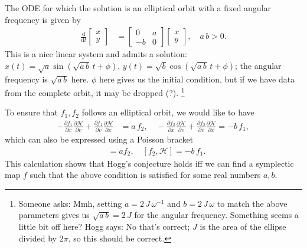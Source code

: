 \documentclass{article}
\newcommand{\dd}{\mathrm{d}}
\begin{document}
The ODE for which the solution is an elliptical orbit with a fixed angular frequency is given by 
\begin{align}
    \frac{\dd}{\dd t} \begin{bmatrix} x \\ y \end{bmatrix} &= \begin{bmatrix} 0 & a \\ -b & 0 \end{bmatrix} \begin{bmatrix} x \\ y \end{bmatrix}, \quad a\,b > 0. 
\end{align}
This is a nice linear system and admits a solution:  $x(t)=\sqrt{a} \sin(\sqrt{a\,b}\,t + \phi) $, $y(t)= \sqrt{b} \cos(\sqrt{a\,b}\,t + \phi)$; the angular frequency is $\sqrt{a\,b}$ here. $\phi$ here gives us the initial condition, but if we have data from the complete orbit, it may be dropped (?). \footnote{Someone asks: Mmh, setting $a = 2\,J\,\omega^{-1}$ and $b = 2\,J\,\omega$ to match the above parameters gives us $\sqrt{a\,b}=2\,J$ for the angular frequency. Something seems a little bit off here? Hogg says: No that's correct; $J$ is the area of the ellipse divided by $2\pi$, so this should be correct.}

To ensure that $f_1, f_2$ follows an elliptical orbit, we would like to have
\begin{align}
    - \frac{\partial f_1}{\partial x} \frac{\partial \mathcal{H}}{\partial v} + \frac{\partial f_1}{\partial v} \frac{\partial \mathcal{H}}{\partial x} &= a\,f_2, \quad
     - \frac{\partial f_2}{\partial x} \frac{\partial \mathcal{H}}{\partial v} + \frac{\partial f_2}{\partial v} \frac{\partial \mathcal{H}}{\partial x} = -b\,f_1,
\end{align}
which can also be expressed using a Poisson bracket 
\begin{align}
    [f_1, \mathcal{H}] &= a f_2, \quad [f_2, \mathcal{H}] = -b\,f_1. 
\end{align}
This calculation shows that Hogg's conjecture holds iff we can find a symplectic map $f$ such that the above condition is satisfied for some real numbers $a, b$. 
\end{document}
